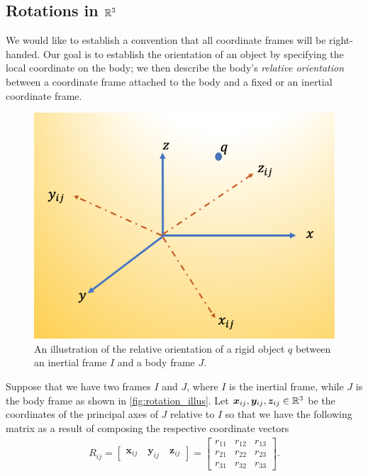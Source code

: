 \subsection{Rotations in $\mathbb{R}^3$}
%
We would like to establish a convention  that all coordinate frames will be right-handed. Our goal is to establish the orientation of an object by specifying the local coordinate on the body; we then describe the body's \textit{relative orientation} between a coordinate frame attached to the body and a fixed or an inertial coordinate frame. 
%
\begin{figure}[tb!]
	\centering
	\includegraphics[width=\columnwidth]{figures/rotation_illus.png}
	\caption{An illustration of the relative orientation of a rigid object $q$ between an inertial frame $I$ and a body frame $J$.}
	\label{fig:rotation_illus}
\end{figure}
%
Suppose that we have two frames $I$ and $J$, where $I$ is the inertial frame, while $J$ is the body frame as shown in \autoref{fig:rotation_illus}. Let $\bm{x}_{ij}, \bm{y}_{ij},\bm{z}_{ij} \in \mathbb{R}^3$ be the coordinates of the principal axes of $J$ relative to $I$ so that we have the following matrix as a result of composing the respective coordinate vectors
%
\begin{align}
R_{ij} = \begin{bmatrix}
\bm{x}_{ij} \quad  \bm{y}_{ij} \quad \bm{z}_{ij}
\end{bmatrix} = \begin{bmatrix}
r_{11} &  r_{12} & r_{13} \\
r_{21} & r_{22} &  r_{23} \\
r_{31} & r_{32} &  r_{33}
\end{bmatrix}.
\label{eq:rotation_compoz}
\end{align}
